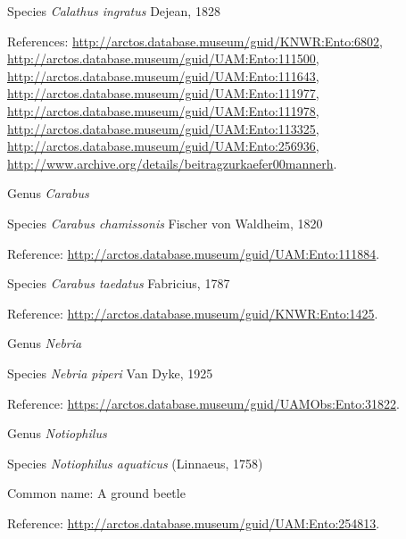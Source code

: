\documentclass[9pt, article]{memoir}
\begin{document}
\begin{multicols}{2}
\vspace{6pt}\noindent\hspace{36pt}Species \textit{Calathus ingratus} Dejean, 1828


References: 
\url{http://arctos.database.museum/guid/KNWR:Ento:6802}, 
\url{http://arctos.database.museum/guid/UAM:Ento:111500}, 
\url{http://arctos.database.museum/guid/UAM:Ento:111643}, 
\url{http://arctos.database.museum/guid/UAM:Ento:111977}, 
\url{http://arctos.database.museum/guid/UAM:Ento:111978}, 
\url{http://arctos.database.museum/guid/UAM:Ento:113325}, 
\url{http://arctos.database.museum/guid/UAM:Ento:256936}, 
\url{http://www.archive.org/details/beitragzurkaefer00mannerh}.

\vspace{6pt}\noindent\hspace{30pt}Genus \textit{Carabus}


\vspace{6pt}\noindent\hspace{36pt}Species \textit{Carabus chamissonis} Fischer von Waldheim, 1820


Reference: 
\url{http://arctos.database.museum/guid/UAM:Ento:111884}.

\vspace{6pt}\noindent\hspace{36pt}Species \textit{Carabus taedatus} Fabricius, 1787


Reference: 
\url{http://arctos.database.museum/guid/KNWR:Ento:1425}.

\vspace{6pt}\noindent\hspace{30pt}Genus \textit{Nebria}


\vspace{6pt}\noindent\hspace{36pt}Species \textit{Nebria piperi} Van Dyke, 1925


Reference: 
\url{https://arctos.database.museum/guid/UAMObs:Ento:31822}.

\vspace{6pt}\noindent\hspace{30pt}Genus \textit{Notiophilus}


\vspace{6pt}\noindent\hspace{36pt}Species \textit{Notiophilus aquaticus} (Linnaeus, 1758)


Common name: A ground beetle

Reference: 
\url{http://arctos.database.museum/guid/UAM:Ento:254813}.


\end{multicols}
\end{document}

